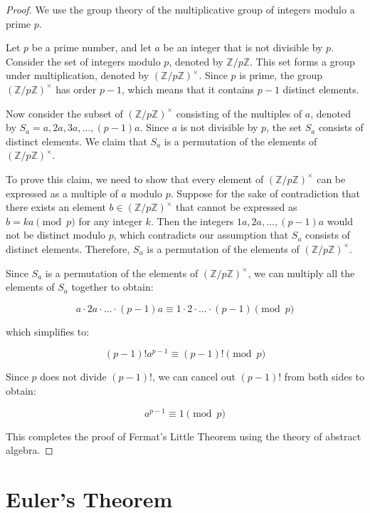 \documentclass[12pt,openany]{book}
\theoremstyle{definition}
\begin{document}
	\begin{proof}
		We use the group theory of the multiplicative group of integers modulo a prime $p$.
		
		Let $p$ be a prime number, and let $a$ be an integer that is not divisible by $p$. Consider the set of integers modulo $p$, denoted by $\mathbb{Z}/p\mathbb{Z}$. This set forms a group under multiplication, denoted by $(\mathbb{Z}/p\mathbb{Z})^{\times}$. Since $p$ is prime, the group $(\mathbb{Z}/p\mathbb{Z})^{\times}$ has order $p-1$, which means that it contains $p-1$ distinct elements.
		
		Now consider the subset of $(\mathbb{Z}/p\mathbb{Z})^{\times}$ consisting of the multiples of $a$, denoted by $S_a = {a, 2a, 3a, \ldots, (p-1)a}$. Since $a$ is not divisible by $p$, the set $S_a$ consists of distinct elements. We claim that $S_a$ is a permutation of the elements of $(\mathbb{Z}/p\mathbb{Z})^{\times}$.
		
		To prove this claim, we need to show that every element of $(\mathbb{Z}/p\mathbb{Z})^{\times}$ can be expressed as a multiple of $a$ modulo $p$. Suppose for the sake of contradiction that there exists an element $b \in (\mathbb{Z}/p\mathbb{Z})^{\times}$ that cannot be expressed as $b = ka \pmod{p}$ for any integer $k$. Then the integers $1a, 2a, \ldots, (p-1)a$ would not be distinct modulo $p$, which contradicts our assumption that $S_a$ consists of distinct elements. Therefore, $S_a$ is a permutation of the elements of $(\mathbb{Z}/p\mathbb{Z})^{\times}$.
		
		Since $S_a$ is a permutation of the elements of $(\mathbb{Z}/p\mathbb{Z})^{\times}$, we can multiply all the elements of $S_a$ together to obtain:
		
		$$a \cdot 2a \cdot \ldots \cdot (p-1)a \equiv 1 \cdot 2 \cdot \ldots \cdot (p-1) \pmod{p}$$
		
		which simplifies to:
		
		$$(p-1)!a^{p-1} \equiv (p-1)! \pmod{p}$$
		
		Since $p$ does not divide $(p-1)!$, we can cancel out $(p-1)!$ from both sides to obtain:
		
		$$a^{p-1} \equiv 1 \pmod{p}$$
		
		This completes the proof of Fermat's Little Theorem using the theory of abstract algebra.
	\end{proof}
	
	\newpage
	\section{Euler's Theorem}
	
\end{document}
